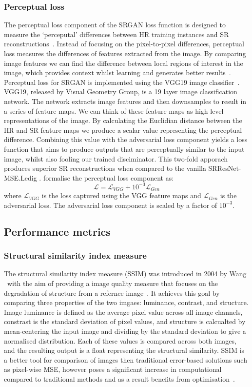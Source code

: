 \subsubsection{Perceptual loss}
The perceptual loss component of the SRGAN loss function is designed to measure the `perceputal' differences between HR training instances and SR reconstructions~\cite{srgan}. Instead of focusing on the pixel-to-pixel differences, perceptual loss measures the differences of features extracted from the image. By comparing image features we can find the difference between local regions of interest in the image, which provides context whilst learning and generates better results~\cite{ref}. Perceptual loss for SRGAN is implemented using the VGG19 image classifier~\cite{srgan}. VGG19, released by Visual Geometry Group, is a 19 layer image classification network. The network extracts image features and then downsamples to result in a series of feature maps. We can think of these feature maps as high level representations of the image. By calculating the Euclidian distance between the HR and SR feature maps we produce a scalar value representing the perceptual difference. Combining this value with the adversarial loss component yields a loss function that aims to produce outputs that are perceptually similar to the input image, whilst also fooling our trained disciminator. This two-fold apporach produces superior SR reconstructions when compared to the vanilla SRResNet-MSE.\@ Ledig \etal. formalise the perceptual loss component as:
\[\mathcal{L} = \mathcal{L}_{VGG} + 10^{-3} \mathcal{L}_{Gen}\]
where $\mathcal{L}_{VGG}$ is the loss captured using the VGG feature maps and $\mathcal{L}_{Gen}$ is the adversarial loss. The adversarial loss component is scaled by a factor of $10^{-3}$.

\subsection{Performance metrics}
\subsubsection{Structural similarity index measure}
The structural similarity index measure (SSIM) was introduced in 2004 by Wang \etal\ with the aim of providing a image quality measure that focuses on the degradation of structure from a refernce image~\cite{ssim}. It achieves this goal by comparing three properties of the two imgaes: luminance, contrast, and structure. Image luminance is defined as the average pixel value across all image channels, constrast is the standard deviation of pixel values, and structure is calcualted by mean-centering the input image and dividing by the standard deviation to give a normalised distribution. Each of these values is compared across both images, and the resulting output is a float representing the structural similarity. SSIM is a better tool for comparison of images then traditional error-based solutions such as pixel-wise MSE, however poses a significant increase in computational compared to traditional methods and as a result benefits from optimisation~\cite{ssim}.

